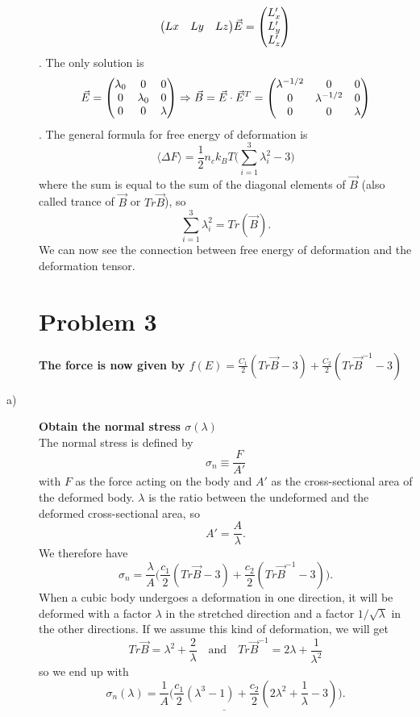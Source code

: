 \documentclass[norsk,a4paper,12pt]{article}
\begin{document}
\begin{description}
$$\mqty(Lx&Ly&Lz)\vec{E}=\mqty(L'_x\\L'_y\\L'_z)$$.
The only solution is
$$\vec{E}=\mqty(\lambda_0&0&0\\0&\lambda_0&0\\0&0&\lambda)\Rightarrow \vec{B}=\vec{E}\cdot\vec{E}^T=\mqty(\lambda^{-1/2}&0&0\\0&\lambda^{-1/2}&0\\0&0&\lambda)$$.
The general formula for free energy of deformation is 
\begin{equation}
\langle \Delta F\rangle = \frac{1}{2}n_ck_BT\bigg(\sum_{i=1}^3\lambda_i^2-3\bigg)
\end{equation}
where the sum is equal to the sum of the diagonal elements of $\vec{B}$ (also called trance of $\vec{B}$ or $Tr\vec{B}$), so
$$\sum_{i=1}^3\lambda_i^2=Tr(\vec{B}).$$
We can now see the connection between free energy of deformation and the deformation tensor.

\section*{Problem 3}
\textbf{The force is now given by $f(E)=\frac{C_1}{2}(Tr \vec{B}-3)+\frac{C_2}{2}(Tr \vec{B}^{-1}-3)$}\\
\item [a)] \textbf{Obtain the normal stress $\sigma(\lambda)$}\\
The normal stress is defined by
\begin{equation}
\sigma_n\equiv \frac{F}{A'}
\end{equation}
with $F$ as the force acting on the body and $A'$ as the cross-sectional area of the deformed body. $\lambda$ is the ratio between the undeformed and the deformed cross-sectional area, so 
\begin{equation}
A'=\frac{A}{\lambda}.
\end{equation}
We therefore have
$$\sigma_n=\frac{\lambda}{A}\bigg(\frac{c_1}{2}(Tr \vec{B}-3)+\frac{c_2}{2}(Tr \vec{B}^{-1}-3)\bigg).$$
When a cubic body undergoes a deformation in one direction, it will be deformed with a factor $\lambda$ in the stretched direction and a factor $1/\sqrt{\lambda}$ in the other directions. If we assume this kind of deformation, we will get
$$Tr \vec{B} = \lambda^2+\frac{2}{\lambda}\quad\text{and}\quad Tr \vec{B}^{-1}=2\lambda+\frac{1}{\lambda^2}$$
so we end up with 
\begin{equation}
\underline{\sigma_n(\lambda)=\frac{1}{A}\bigg(\frac{c_1}{2}(\lambda^3-1)+\frac{c_2}{2}(2\lambda^2+\frac{1}{\lambda}-3)\bigg)}.
\end{equation}


\end{description}
\end{document}
